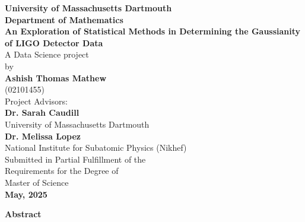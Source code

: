 \documentclass[12pt]{article}
\begin{document}
\begin{titlepage}
  \centering
  {\LARGE \textbf{University of Massachusetts Dartmouth}}\\[0.5cm]
  {\Large \textbf{Department of Mathematics}}\\[2cm]
  {\huge \textbf{An Exploration of Statistical Methods in Determining the Gaussianity of LIGO Detector Data}}\\[2cm]
  {\Large A Data Science project}\\[0.2cm]
  {\Large by}\\[0.2cm]
  {\Large \textbf{Ashish Thomas Mathew}}\\[0.2cm]
  {\Large (02101455)}\\[1.5cm]
  {\Large Project Advisors:}\\[0.75cm]
  {\Large \textbf{Dr. Sarah Caudill}}\\[0.2cm]
  {\Large University of Massachusetts Dartmouth}\\[0.75cm]{\Large \textbf{Dr. Melissa Lopez}}\\[0.2cm]
  {\Large National Institute for Subatomic Physics (Nikhef)}\\[1.5cm]
  {\Large Submitted in Partial Fulfillment of the}\\[0.2cm]
  {\Large Requirements for the Degree of}\\[0.2cm]
  {\Large Master of Science}\\[1.5cm]
  {\large \textbf{May, 2025}}
  \vfill
\end{titlepage}

\clearpage  %
\normalfont %
\raggedright %

\begin{center}
    \Large \textbf{Abstract}  %
\end{center}

\justifying
\end{document}
